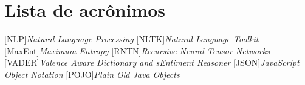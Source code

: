 \documentclass{iiufrgs}
\begin{document}
\tableofcontents

\chapter*{Lista de acrônimos}

\vspace{20px}
\begin{acronym}[XXXXXXXXXX]
[NLP]{\textit{Natural Language Processing}}
[NLTK]{\textit{Natural Language Toolkit}}
[MaxEnt]{\textit{Maximum Entropy}}
[RNTN]{\textit{Recursive Neural Tensor Networks}}
[VADER]{\textit{Valence Aware Dictionary and sEntiment Reasoner}}
[JSON]{\textit{JavaScript Object Notation}}
[POJO]{\textit{Plain Old Java Objects}}
\end{acronym}
\listoffigures
\listoftables


\begin{abstract}


\end{abstract}


\acresetall






% 
% 
% 



\end{document}
